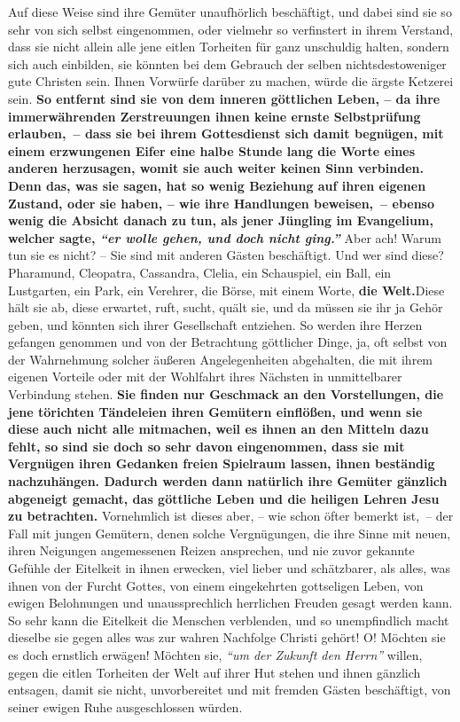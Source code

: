 Auf diese Weise sind ihre Gemüter unaufhörlich beschäftigt, und dabei sind sie
so sehr von sich selbst eingenommen, oder vielmehr so verfinstert in ihrem
Verstand, dass sie nicht allein alle jene eitlen Torheiten für ganz unschuldig
halten, sondern sich auch einbilden, sie könnten bei dem Gebrauch der selben
nichtsdestoweniger gute Christen sein. Ihnen
Vorwürfe
darüber zu machen, würde
die ärgste Ketzerei sein.
\label{ref:17_04_gottesdienst}
\textbf{So entfernt sind sie von dem inneren göttlichen Leben,
-- da ihre immerwährenden Zerstreuungen ihnen keine ernste
Selbstprüfung
erlauben,~-- dass sie bei ihrem Gottesdienst
sich damit begnügen, mit einem
erzwungenen Eifer eine halbe Stunde lang die Worte eines anderen herzusagen,
womit sie auch weiter keinen Sinn verbinden. Denn das, was sie sagen, hat so
wenig Beziehung auf ihren eigenen Zustand, oder sie haben, -- wie ihre
Handlungen beweisen,~-- ebenso wenig die Absicht danach zu tun, als jener
Jüngling im Evangelium, welcher sagte,
\textit{"`er wolle gehen, und doch nicht ging."'}}
Aber ach! Warum tun sie es nicht? -- Sie sind mit anderen Gästen beschäftigt.
Und wer sind diese? Pharamund,
Cleopatra, Cassandra,
Clelia, ein Schauspiel, ein
Ball, ein Lustgarten, ein Park, ein Verehrer, die Börse, mit einem
Worte, \textbf{die
Welt.}Diese hält sie ab, diese erwartet, ruft,
sucht, quält sie, und da müssen
sie ihr ja Gehör geben, und könnten sich ihrer Gesellschaft entziehen. So werden
ihre Herzen gefangen genommen und von der Betrachtung göttlicher Dinge, ja, oft
selbst von der Wahrnehmung solcher äußeren Angelegenheiten abgehalten, die mit
ihrem eigenen Vorteile oder mit der Wohlfahrt ihres Nächsten in unmittelbarer
Verbindung stehen. \textbf{Sie finden nur Geschmack an den Vorstellungen, die
jene
törichten Tändeleien ihren Gemütern einflößen, und wenn sie diese auch nicht
alle mitmachen, weil es ihnen an den Mitteln dazu fehlt, so sind sie doch so
sehr davon eingenommen, dass sie mit Vergnügen ihren Gedanken freien Spielraum
lassen, ihnen beständig nachzuhängen. Dadurch werden dann natürlich ihre
Gemüter gänzlich abgeneigt gemacht, das göttliche Leben und die heiligen Lehren
Jesu zu betrachten.} Vornehmlich ist dieses aber, -- wie schon öfter bemerkt
ist,~-- der Fall mit jungen Gemütern, denen solche Vergnügungen, die ihre Sinne mit
neuen, ihren Neigungen angemessenen Reizen ansprechen, und nie zuvor gekannte
Gefühle der Eitelkeit in ihnen erwecken, viel lieber und schätzbarer, als
alles, was ihnen von der Furcht Gottes, von einem eingekehrten gottseligen
Leben, von ewigen Belohnungen und unaussprechlich herrlichen Freuden gesagt
werden kann. So sehr kann die Eitelkeit die Menschen verblenden, und so
unempfindlich macht dieselbe sie gegen alles was zur wahren Nachfolge Christi
gehört! O! Möchten sie es doch ernstlich erwägen! Möchten sie,
\textit{"`um der Zukunft
den Herrn"'} willen, gegen die eitlen Torheiten der Welt auf ihrer Hut stehen
und ihnen gänzlich entsagen, damit sie nicht, unvorbereitet und mit fremden
Gästen beschäftigt, von seiner ewigen Ruhe ausgeschlossen würden.

